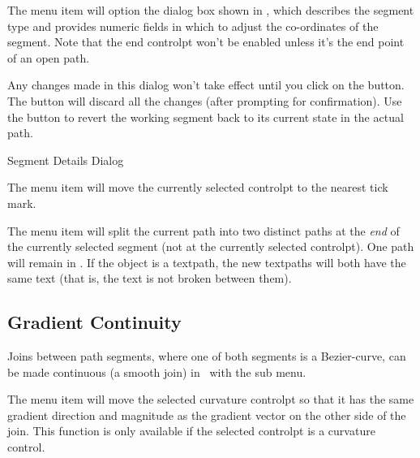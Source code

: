 
The  menu item will option the 
 dialog box shown in
, which describes the segment type and
provides numeric fields in which to adjust the co-ordinates of the
segment. Note that the end \gls{controlpt} won't be enabled unless 
it's the end point of an open path.

Any changes made in this dialog won't take effect until you click on
the  button. The  button will discard all the
changes (after prompting for confirmation). Use the 
 button to revert the working segment
back to its current state in the actual path.

{}
{Segment Details Dialog}


The  menu item will
move the currently selected \gls*{controlpt} to the nearest
tick mark.


The  menu item will split the current path
into two distinct \glspl{path} at the \emph{end} of the currently
selected segment (not at the currently selected \gls*{controlpt}).
One path will remain in \editpathmode. 
If the object is a \gls*{textpath}, the new \glspl*{textpath} will
both have the same text (that is, the text is not broken between
them).


\subsection{Gradient Continuity}\label{sec:continous}

Joins between \gls{path} segments, where one of both segments is a
\gls{Bezier-curve}, can be made continuous (a smooth join)
in \editpathmode\ with the  sub menu.


The  menu item will move the selected
curvature \gls*{controlpt} so that it has the same gradient
direction and magnitude as the gradient vector on the other side of
the join.
This function is only available if the selected \gls{controlpt} is
a curvature control.

